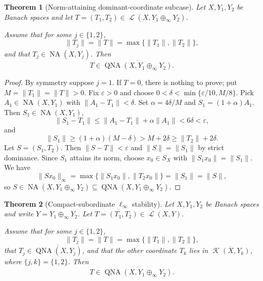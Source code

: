 \documentclass[11pt]{article}
\newtheorem{theorem}{Theorem}
\DeclareMathOperator{\QNA}{QNA}
\DeclareMathOperator{\NA}{NA}
\DeclareMathOperator{\Lin}{\mathcal L}
\DeclareMathOperator{\K}{\mathcal K}
\begin{document}
\begin{theorem}[Norm-attaining dominant-coordinate subcase]
\label{thm:na-dominant}
Let $X,Y_1,Y_2$ be Banach spaces and let
$T=(T_1,T_2)\in \Lin(X,Y_1\oplus_\infty Y_2)$.

Assume that for some $j\in\{1,2\}$,
\[
  \|T_j\|=\|T\|=\max\{\|T_1\|,\|T_2\|\},
\]
and that $T_j\in\overline{\NA(X,Y_j)}$. Then
\[
  T\in \overline{\QNA(X,Y_1\oplus_\infty Y_2)}.
\]
\end{theorem}

\begin{proof}
By symmetry suppose $j=1$. If $T=0$, there is nothing to prove; put
$M=\|T_1\|=\|T\|>0$. Fix $\varepsilon>0$ and choose
$0<\delta<\min\{\varepsilon/10,M/8\}$. Pick
$A_1\in\NA(X,Y_1)$ with $\|A_1-T_1\|<\delta$. Set
$\alpha=4\delta/M$ and $S_1=(1+\alpha)A_1$. Then
$S_1\in\NA(X,Y_1)$,
\[
  \|S_1-T_1\|
  \leq \|A_1-T_1\|+\alpha\|A_1\|
  <6\delta<\varepsilon,
\]
and
\[
  \|S_1\|\geq (1+\alpha)(M-\delta)>M+2\delta\geq \|T_2\|+2\delta.
\]
Let $S=(S_1,T_2)$. Then $\|S-T\|<\varepsilon$ and
$\|S\|=\|S_1\|$ by strict dominance. Since $S_1$ attains its norm, choose
$x_0\in S_X$ with $\|S_1x_0\|=\|S_1\|$. We have
\[
  \|Sx_0\|_\infty
  =\max\{\|S_1x_0\|,\|T_2x_0\|\}
  =\|S_1\|=\|S\|,
\]
so $S\in\NA(X,Y_1\oplus_\infty Y_2)\subseteq
\QNA(X,Y_1\oplus_\infty Y_2)$.
\end{proof}

\begin{theorem}[Compact-subordinate $\ell_\infty$ stability]
\label{thm:compact-subordinate}
Let $X,Y_1,Y_2$ be Banach spaces and write
$Y=Y_1\oplus_\infty Y_2$. Let $T=(T_1,T_2)\in \Lin(X,Y)$.

Assume that for some $j\in\{1,2\}$,
\[
  \|T_j\|=\|T\|=\max\{\|T_1\|,\|T_2\|\},
\]
that $T_j\in \overline{\QNA(X,Y_j)}$, and that the other coordinate
$T_k$ lies in $\overline{\K(X,Y_k)}$, where $\{j,k\}=\{1,2\}$.
Then
\[
  T\in \overline{\QNA(X,Y_1\oplus_\infty Y_2)}.
\]
\end{theorem}
\end{document}
